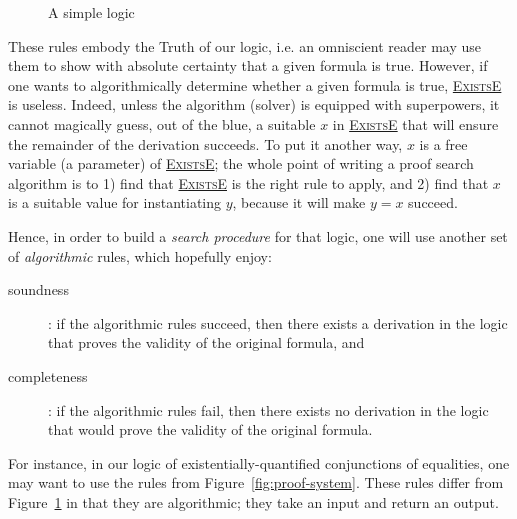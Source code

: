 \documentclass{easychair}
\let\TirName\textsc
\renewcommand{\DefTirName}[1]{\hyperlink{#1}{\TirName {#1}}}
\let\Rule\DefTirName
\newcommand{\fref}[1]{Figure~\ref{fig:#1}}
\begin{document}
\begin{figure}
  \centering
  \begin{mathpar}


  \end{mathpar}
  \caption{A simple logic}
  \label{fig:logic}
\end{figure}

These rules embody the Truth of our logic, i.e. an omniscient reader may use
them to show with absolute certainty that a given formula is true.
%
However, if one wants to algorithmically determine whether a given formula is
true, \Rule{ExistsE} is useless. Indeed, unless the algorithm (solver) is
equipped with superpowers, it cannot magically guess, out of the blue, a
suitable $x$ in \Rule{ExistsE} that will ensure the remainder of the derivation
succeeds. To put it another way, $x$ is a free variable (a parameter) of
\Rule{ExistsE}; the whole point of writing a proof search algorithm is to 1)
find that \Rule{ExistsE} is the right rule to apply, and 2) find that $x$ is a
suitable value for instantiating $y$, because it will make $y = x$ succeed.

Hence, in order to build a \emph{search procedure} for that logic, one will
use another set of \emph{algorithmic} rules, which hopefully enjoy:
\begin{description}
  \item[soundness]: if the algorithmic rules succeed, then there exists a
    derivation in the logic that proves the validity of the original formula,
    and
  \item[completeness]: if the algorithmic rules fail, then there exists no
    derivation in the logic that would prove the validity of the original
    formula.
\end{description}

For instance, in our logic of existentially-quantified conjunctions of
equalities, one may want to use the rules from \fref{proof-system}. These rules
differ from \fref{logic} in that they are algorithmic; they take an input and
return an output.
\end{document}
